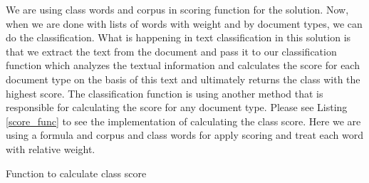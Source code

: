 \par
We are using class words and corpus in scoring function for the solution. Now, when we are done with lists of words with weight and by document types, we can do the classification. What is happening in text classification in this solution is that we extract the text from the document and pass it to our classification function which analyzes the textual information and calculates the score for each document type on the basis of this text and ultimately returns the class with the highest score. The classification function is using another method that is responsible for calculating the score for any document type. Please see Listing \ref{score_func} to see the implementation of calculating the class score. Here we are using a formula and corpus and class words for apply scoring and treat each word with relative weight.
\begin{listing}
\caption{Function to calculate class score}
\label{score_func}
\end{listing}
